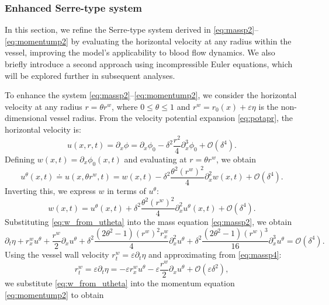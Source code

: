 \documentclass[alpha-refs, 12pt]{wiley-article}
\renewcommand{\O}{\mathcal{O}}
\renewcommand{\leq}{\leqslant}
\newcommand{\eps}{\varepsilon}
\begin{document}
\subsubsection{Enhanced Serre-type system}\label{sec:cbsys}

In this section, we refine the Serre-type system derived in \eqref{eq:massp2}--\eqref{eq:momentump2} by evaluating the horizontal velocity at any radius within the vessel, improving the model's applicability to blood flow dynamics. We also briefly introduce a second approach using incompressible Euler equations, which will be explored further in subsequent analyses.

To enhance the system \eqref{eq:massp2}--\eqref{eq:momentump2}, we consider the horizontal velocity at any radius $r = \theta r^w$, where $0 \leq \theta \leq 1$ and $r^w = r_0(x) + \eps \eta$ is the non-dimensional vessel radius. From the velocity potential expansion \eqref{eq:potapr}, the horizontal velocity is:
\[
  u(x, r, t) = \partial_x \phi = \partial_x \phi_0 - \delta^2 \frac{r^2}{4} \partial_x^3 \phi_0 + \O(\delta^4).
\]
Defining $w(x, t) = \partial_x \phi_0(x, t)$ and evaluating at $r = \theta r^w$, we obtain
\begin{equation}\label{eq:generalu}
  u^\theta(x, t) \doteq u(x, \theta r^w, t) = w(x, t) - \delta^2 \frac{\theta^2 (r^w)^2}{4} \partial_x^2 w(x, t) + \O(\delta^4).
\end{equation}
Inverting this, we express $w$ in terms of $u^\theta$:
\begin{equation}\label{eq:w_from_utheta}
  w(x, t) = u^\theta(x, t) + \delta^2 \frac{\theta^2 (r^w)^2}{4} \partial_x^2 u^\theta(x, t) + \O(\delta^4).
\end{equation}
Substituting \eqref{eq:w_from_utheta} into the mass equation \eqref{eq:massp2}, we obtain
\begin{equation}\label{eq:massp4}
  \partial_t \eta + r^w_x u^\theta + \frac{r^w}{2} \partial_x u^\theta + \delta^2 \frac{(2 \theta^2 - 1) (r^w)^2 r^w_x}{4} \partial_x^2 u^\theta + \delta^2 \frac{(2 \theta^2 - 1) (r^w)^3}{16} \partial_x^3 u^\theta = \O(\delta^4).
\end{equation}
Using the vessel wall velocity $r^w_t = \eps \partial_t \eta$ and approximating from \eqref{eq:massp4}:
\begin{equation}\label{eq:rw_t}
  r^w_t = \eps \partial_t \eta = -\eps r^w_x u^\theta - \eps \frac{r^w}{2} \partial_x u^\theta + \O(\eps \delta^2),
\end{equation}
we substitute \eqref{eq:w_from_utheta} into the momentum equation \eqref{eq:momentump2} to obtain
\end{document}
